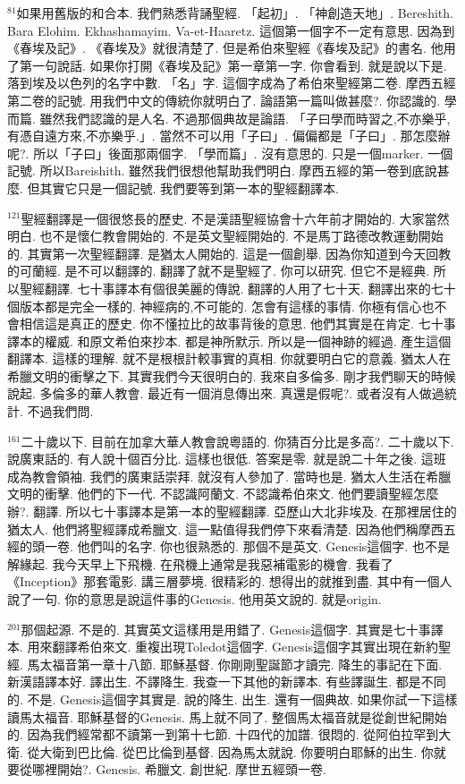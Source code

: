 \documentclass{book}
\begin{document}
$^{81}$如果用舊版的和合本.
我們熟悉背誦聖經.
「起初」.
「神創造天地」.
Bereshith.
Bara Elohim.
Ekhashamayim.
Va-et-Haaretz.
這個第一個字不一定有意思.
因為到《春埃及記》.
《春埃及》就很清楚了.
但是希伯來聖經《春埃及記》的書名.
他用了第一句說話.
如果你打開《春埃及記》第一章第一字.
你會看到.
就是說以下是.
落到埃及以色列的名字中數.
「名」字.
這個字成為了希伯來聖經第二卷.
摩西五經第二卷的記號.
用我們中文的傳統你就明白了.
論語第一篇叫做甚麼?.
你認識的.
學而篇.
雖然我們認識的是人名.
不過那個典故是論語.
「子曰學而時習之,不亦樂乎,有憑自遠方來,不亦樂乎.」.
當然不可以用「子曰」.
偏偏都是「子曰」.
那怎麼辦呢?.
所以「子曰」後面那兩個字.
「學而篇」.
沒有意思的.
只是一個marker.
一個記號.
所以Bareishith.
雖然我們很想他幫助我們明白.
摩西五經的第一卷到底說甚麼.
但其實它只是一個記號.
我們要等到第一本的聖經翻譯本.

$^{121}$聖經翻譯是一個很悠長的歷史.
不是漢語聖經協會十六年前才開始的.
大家當然明白.
也不是懷仁教會開始的.
不是英文聖經開始的.
不是馬丁路德改教運動開始的.
其實第一次聖經翻譯.
是猶太人開始的.
這是一個創舉.
因為你知道到今天回教的可蘭經.
是不可以翻譯的.
翻譯了就不是聖經了.
你可以研究.
但它不是經典.
所以聖經翻譯.
七十事譯本有個很美麗的傳說.
翻譯的人用了七十天.
翻譯出來的七十個版本都是完全一樣的.
神經病的,不可能的.
怎會有這樣的事情.
你極有信心也不會相信這是真正的歷史.
你不懂拉比的故事背後的意思.
他們其實是在肯定.
七十事譯本的權威.
和原文希伯來抄本.
都是神所默示.
所以是一個神跡的經過.
產生這個翻譯本.
這樣的理解.
就不是根根計較事實的真相.
你就要明白它的意義.
猶太人在希臘文明的衝擊之下.
其實我們今天很明白的.
我來自多倫多.
剛才我們聊天的時候說起.
多倫多的華人教會.
最近有一個消息傳出來.
真還是假呢?.
或者沒有人做過統計.
不過我們問.

$^{161}$二十歲以下.
目前在加拿大華人教會說粵語的.
你猜百分比是多高?.
二十歲以下.
說廣東話的.
有人說十個百分比.
這樣也很低.
答案是零.
就是說二十年之後.
這班成為教會領袖.
我們的廣東話崇拜.
就沒有人參加了.
當時也是.
猶太人生活在希臘文明的衝擊.
他們的下一代.
不認識阿蘭文.
不認識希伯來文.
他們要讀聖經怎麼辦?.
翻譯.
所以七十事譯本是第一本的聖經翻譯.
亞歷山大北非埃及.
在那裡居住的猶太人.
他們將聖經譯成希臘文.
這一點值得我們停下來看清楚.
因為他們稱摩西五經的頭一卷.
他們叫的名字.
你也很熟悉的.
那個不是英文.
Genesis這個字.
也不是解緣起.
我今天早上下飛機.
在飛機上通常是我惡補電影的機會.
我看了《Inception》那套電影.
講三層夢境.
很精彩的.
想得出的就推到盡.
其中有一個人說了一句.
你的意思是說這件事的Genesis.
他用英文說的.
就是origin.

$^{201}$那個起源.
不是的.
其實英文這樣用是用錯了.
Genesis這個字.
其實是七十事譯本.
用來翻譯希伯來文.
重複出現Toledot這個字.
Genesis這個字其實出現在新約聖經.
馬太福音第一章十八節.
耶穌基督.
你剛剛聖誕節才讀完.
降生的事記在下面.
新漢語譯本好.
譯出生.
不譯降生.
我查一下其他的新譯本.
有些譯誕生.
都是不同的.
不是.
Genesis這個字其實是.
說的降生.
出生.
還有一個典故.
如果你試一下這樣讀馬太福音.
耶穌基督的Genesis.
馬上就不同了.
整個馬太福音就是從創世紀開始的.
因為我們經常都不讀第一到第十七節.
十四代的加譜.
很悶的.
從阿伯拉罕到大衛.
從大衛到巴比倫.
從巴比倫到基督.
因為馬太就說.
你要明白耶穌的出生.
你就要從哪裡開始?.
Genesis.
希臘文.
創世紀.
摩世五經頭一卷.
\end{document}

